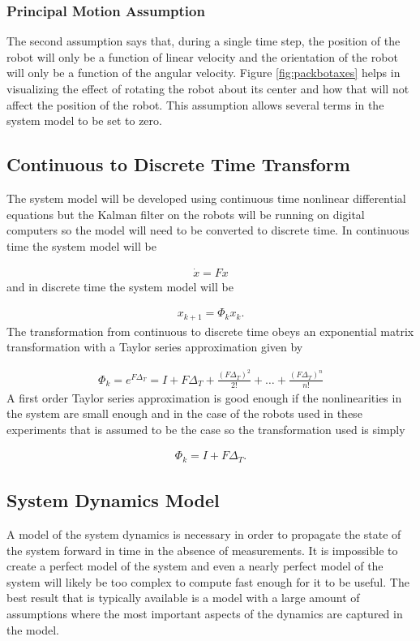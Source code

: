 \subsubsection{Principal Motion Assumption}
\label{sec:kfPrincipalMotionAssumption}
The second assumption says that, during a single time step, the position of the robot will only be a function of linear velocity and the orientation of the robot will only be a function of the angular velocity. Figure \ref{fig:packbotaxes} helps in visualizing the effect of rotating the robot about its center and how that will not affect the position of the robot. This assumption allows several terms in the system model to be set to zero.

\subsection{Continuous to Discrete Time Transform}
\label{sec:kfContToDiscTransform}
The system model will be developed using continuous time nonlinear differential equations but the Kalman filter on the robots will be running on digital computers so the model will need to be converted to discrete time. In continuous time the system model will be

\begin{align*}
\dot{x} = Fx
\end{align*}
and in discrete time the system model will be

\begin{align*}
x_{k+1} = \Phi_k x_k.
\end{align*}
The transformation from continuous to discrete time obeys an exponential matrix transformation with a Taylor series approximation \cite{Gopal93} given by

\begin{align*}
\Phi_k = e^{F\Delta_T} = I + F\Delta_T + \frac{(F\Delta_T)^2}{2!} + \ldots + \frac{(F\Delta_T)^n}{n!}
\end{align*}
A first order Taylor series approximation is good enough if the nonlinearities in the system are small enough and in the case of the robots used in these experiments that is assumed to be the case so the transformation used is simply

\begin{align}
\label{eq:kfContToDiscTransform}
\Phi_k = I + F\Delta_T.
\end{align}

\subsection{System Dynamics Model}
\label{sec:dynamics}
A model of the system dynamics is necessary in order to propagate the state of the system forward in time in the absence of measurements. It is impossible to create a perfect model of the system and even a nearly perfect model of the system will likely be too complex to compute fast enough for it to be useful. The best result that is typically available is a model with a large amount of assumptions where the most important aspects of the dynamics are captured in the model.

